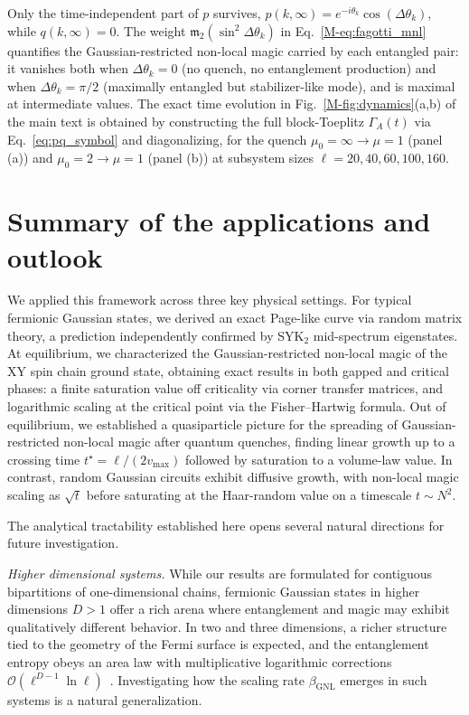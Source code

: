 \documentclass[aps,prl,twocolumn,superscriptaddress,reprint,longbibliography,nofootinbib]{revtex4-2}
\begin{document}
Only the time-independent part of $p$ survives, $p(k,\infty) = e^{-i\theta_k}\cos(\Delta\theta_k)$, while $q(k,\infty) = 0$.
The weight $\mathfrak{m}_2(\sin^2\Delta\theta_k)$ in Eq.~\eqref{M-eq:fagotti_mnl} quantifies the Gaussian-restricted non-local magic carried by each entangled pair: it vanishes both when $\Delta\theta_k = 0$ (no quench, no entanglement production) and when $\Delta\theta_k = \pi/2$ (maximally entangled but stabilizer-like mode), and is maximal at intermediate values.
The exact time evolution in Fig.~\ref{M-fig:dynamics}(a,b) of the main text is obtained by constructing the full block-Toeplitz $\Gamma_A(t)$ via Eq.~\eqref{eq:pq_symbol} and diagonalizing, for the quench $\mu_0 = \infty \to \mu = 1$ (panel (a)) and $\mu_0 = 2 \to \mu = 1$ (panel (b)) at subsystem sizes $\ell = 20, 40, 60, 100, 160$.

\section{Summary of the applications and outlook}
\label{app:outlook}
We applied this framework across three key physical settings.
For typical fermionic Gaussian states, we derived an exact Page-like curve via random matrix theory, a prediction independently confirmed by SYK$_2$ mid-spectrum eigenstates.
At equilibrium, we characterized the Gaussian-restricted non-local magic of the XY spin chain ground state, obtaining exact results in both gapped and critical phases: a finite saturation value off criticality via corner transfer matrices, and logarithmic scaling at the critical point via the Fisher--Hartwig formula.
Out of equilibrium, we established a quasiparticle picture for the spreading of Gaussian-restricted non-local magic after quantum quenches, finding linear growth up to a crossing time $t^\star= \ell/(2v_\mathrm{max})$  followed by saturation to a volume-law value.
In contrast, random Gaussian circuits exhibit diffusive growth, with non-local magic scaling as $\sqrt{t}$ before saturating at the Haar-random value on a timescale $t\sim N^2$.

The analytical tractability established here opens several natural directions for future investigation.

\emph{Higher dimensional systems.}
While our results are formulated for contiguous bipartitions of one-dimensional chains, fermionic Gaussian states in higher dimensions $D>1$ offer a rich arena where entanglement and magic may exhibit qualitatively different behavior. In two and three dimensions, a richer structure tied to the geometry of the Fermi surface is expected, and the entanglement entropy obeys an area law with multiplicative logarithmic corrections $\mathcal{O}(\ell^{D-1}\ln\ell)$~\cite{swingle2010entanglement}. 
Investigating how the scaling rate $\beta_\mathrm{GNL}$ emerges in such systems is a natural generalization.
\end{document}
